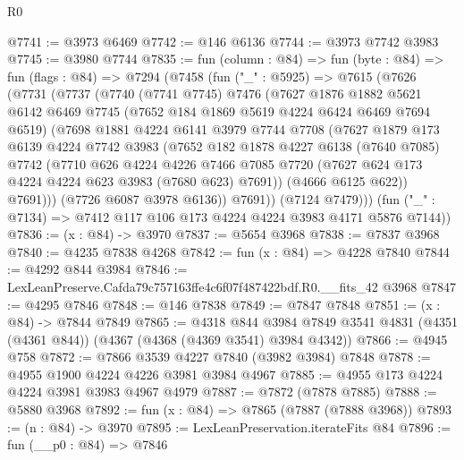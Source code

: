 \begin{lexlean}{R0}
\begin{coremodule}
@7741 := @3973 @6469
@7742 := @146 @6136
@7744 := @3973 @7742 @3983
@7745 := @3980 @7744
@7835 := fun (column : @84) =>
  fun (byte : @84) =>
  fun (flags : @84) =>
  @7294
    (@7458
      (fun ("_" : @5925) =>
      @7615
        (@7626
          (@7731
            (@7737
              (@7740
                (@7741 @7745)
                @7476
                (@7627
                  @1876
                  @1882
                  @5621
                  @6142
                  @6469
                  @7745
                  (@7652 @184 @1869 @5619 @4224 @6424 @6469 @7694 @6519)
                  (@7698
                    @1881
                    @4224
                    @6141
                    @3979
                    @7744
                    @7708
                    (@7627
                      @1879
                      @173
                      @6139
                      @4224
                      @7742
                      @3983
                      (@7652
                        @182
                        @1878
                        @4227
                        @6138
                        (@7640 @7085)
                        @7742
                        (@7710
                          @626
                          @4224
                          @4226
                          @7466
                          @7085
                          @7720
                          (@7627 @624 @173 @4224 @4224 @623 @3983 (@7680 @623) @7691))
                        (@4666 @6125 @622))
                      @7691)))
                (@7726 @6087 @3978 @6136))
              @7691))
          (@7124 @7479)))
      (fun ("_" : @7134) => @7412 @117 @106 @173 @4224 @4224 @3983 @4171 @5876 @7144))
@7836 := (x : @84) -> @3970
@7837 := @5654 @3968
@7838 := @7837 @3968
@7840 := @4235 @7838 @4268
@7842 := fun (x : @84) => @4228 @7840
@7844 := @4292 @844 @3984
@7846 := LexLeanPreserve.Cafda79c757163ffe4c6f07f487422bdf.R0.__fits_42 @3968
@7847 := @4295 @7846
@7848 := @146 @7838
@7849 := @7847 @7848
@7851 := (x : @84) -> @7844 @7849
@7865 := @4318
    @844
    @3984
    @7849
    @3541
    @4831
    (@4351 (@4361 @844))
    (@4367 (@4368 (@4369 @3541) @3984 @4342))
@7866 := @4945 @758
@7872 := @7866 @3539 @4227 @7840 (@3982 @3984) @7848
@7878 := @4955 @1900 @4224 @4226 @3981 @3984 @4967
@7885 := @4955 @173 @4224 @4224 @3981 @3983 @4967 @4979
@7887 := @7872 (@7878 @7885)
@7888 := @5880 @3968
@7892 := fun (x : @84) => @7865 (@7887 (@7888 @3968))
@7893 := (n : @84) -> @3970
@7895 := LexLeanPreservation.iterateFits @84
@7896 := fun (__p0 : @84) => @7846

\end{coremodule}
\end{lexlean}
